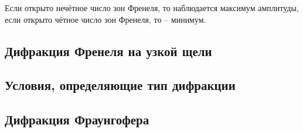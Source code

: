 Если открыто нечётное число зон Френеля, то наблюдается максимум амплитуды, если открыто чётное число зон Френеля, то -- минимум.

\subsection*{Дифракция Френеля на узкой щели}


\subsection*{Условия, определяющие тип дифракции}

\subsection*{Дифракция Фраунгофера}

